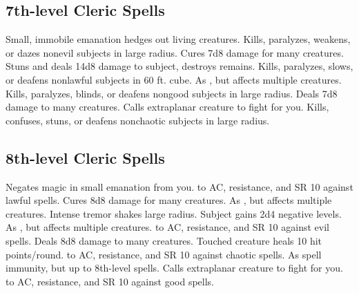 \subsection{7th-level Cleric Spells}
\begin{spelllist}
 Small, immobile emanation hedges out living creatures.
 Kills, paralyzes, weakens, or dazes nonevil subjects in large radius.
 Cures 7d8 damage for many creatures.
\F Stuns and deals 14d8 damage to subject, destroys remains.
 Kills, paralyzes, slows, or deafens nonlawful subjects in 60 ft. cube.
 As , but affects multiple creatures.
 Kills, paralyzes, blinds, or deafens nongood subjects in large radius.
 Deals 7d8 damage to many creatures.
 Calls extraplanar creature to fight for you.
 Kills, confuses, stuns, or deafens nonchaotic subjects in large radius.
\end{spelllist}

\subsection{8th-level Cleric Spells}
\begin{spelllist}
 Negates magic in small emanation from you.
\F {} to AC,  resistance, and SR 10 against lawful spells.
 Cures 8d8 damage for many creatures.
 As , but affects multiple creatures.
 Intense tremor shakes large radius.
 Subject gains 2d4 negative levels.
 As , but affects multiple creatures.
\F {} to AC,  resistance, and SR 10 against evil spells.
 Deals 8d8 damage to many creatures.
 Touched creature heals 10 hit points/round.
\F {} to AC,  resistance, and SR 10 against chaotic spells.
 As spell immunity, but up to 8th-level spells.
 Calls extraplanar creature to fight for you.
\F {} to AC,  resistance, and SR 10 against good spells.
\end{spelllist}

